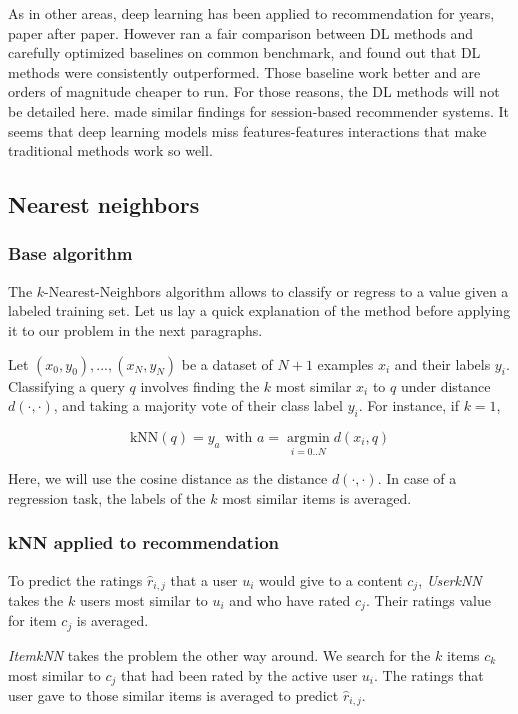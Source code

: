 As in other areas, deep learning has been applied to recommendation for years, paper after paper. However \citet{dlinrec} ran a fair comparison between DL methods and carefully optimized baselines on common benchmark, and found out that DL methods were consistently outperformed. Those baseline work better and are orders of magnitude cheaper to run. For those reasons, the DL methods will not be detailed here. \citet{dlinrecseq} made similar findings for session-based recommender systems. It seems that deep learning models miss features-features interactions that make traditional methods work so well.

\subsection{Nearest neighbors}

\subsubsection{Base algorithm}

The $k$-Nearest-Neighbors algorithm allows to classify or regress to a value given a labeled training set. Let us lay a quick explanation of the method before applying it to our problem in the next paragraphs.

Let ${(x_0, y_0), ..., (x_N, y_N)}$ be a dataset of $N+1$ examples $x_i$ and their labels $y_i$. Classifying a query $q$ involves finding the $k$ most similar $x_i$ to $q$ under distance $d(\cdot, \cdot)$, and taking a majority vote of their class label $y_i$. For instance, if $k=1$,

$$\text{kNN}(q) = y_a \text{ with } a = \operatorname*{argmin}_{i=0..N} d(x_i, q)$$

Here, we will use the cosine distance as the distance $d(\cdot, \cdot)$. In case of a regression task, the labels of the $k$ most similar items is averaged.


\subsubsection{kNN applied to recommendation}

To predict the ratings $\hat{r}_{i,j}$ that a user $u_i$ would give to a content $c_j$, \emph{UserkNN} takes the $k$ users most similar to $u_i$ and who have rated $c_j$. Their ratings value for item $c_j$ is averaged.


\emph{ItemkNN} takes the problem the other way around. We search for the $k$ items $c_k$ most similar to $c_j$ that had been rated by the active user $u_i$. The ratings that user gave to those similar items is averaged to predict $\hat{r}_{i,j}$.

